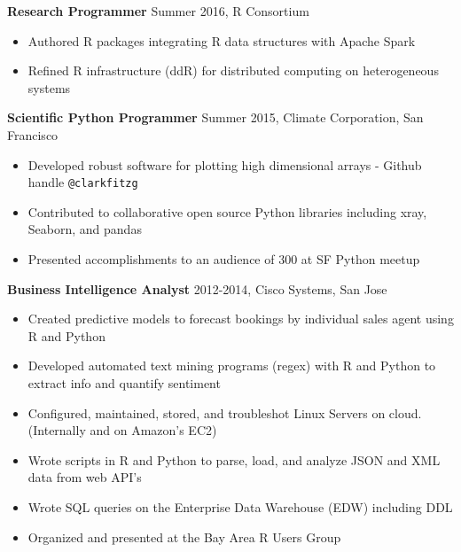 \documentclass{article}
\begin{document}
\begin{description}

\item  \textbf{Research Programmer} 
    \hspace{.5cm} 
    Summer 2016, R Consortium
  
\begin{itemize}
\item Authored R packages integrating R data structures with Apache Spark
\item Refined R infrastructure (ddR) for distributed computing on
    heterogeneous systems
\end{itemize}

\item  \textbf{Scientific Python Programmer} 
    \hspace{.5cm} 
    Summer 2015, Climate Corporation, San Francisco
  
\begin{itemize}
\item Developed robust software for plotting high dimensional arrays -
    Github handle \texttt{@clarkfitzg}
\item Contributed to collaborative open source Python libraries including xray, Seaborn, and pandas
\item Presented accomplishments to an audience of 300 at SF Python meetup
\end{itemize}

\item  \textbf{Business Intelligence Analyst} 
    \hspace{.5cm} 
    2012-2014, Cisco Systems, San Jose
  
\begin{itemize}
\item Created predictive models to forecast bookings by individual sales agent using R and Python
\item Developed automated text mining programs (regex) with R and Python to extract info and quantify sentiment
\item Configured, maintained, stored, and troubleshot Linux Servers on cloud. (Internally and on Amazon's EC2)
\item Wrote scripts in R and Python to parse, load, and analyze JSON and XML data from web API's
\item Wrote SQL queries on the Enterprise Data Warehouse (EDW) including
    DDL
\item Organized and presented at the Bay Area R Users Group
\end{itemize}

\end{description}
\end{document}
